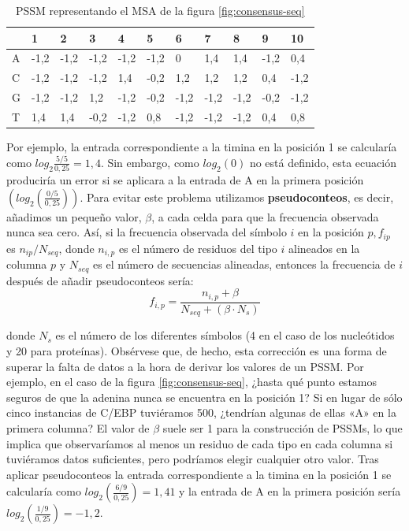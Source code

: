 \begin{table}[htbp]
\centering
\begin{tabular}{l | l l l l l l l l l l }
& 1 & 2 & 3 & 4 & 5 & 6 & 7 & 8 & 9 & 10 \\ \hline
A & -1,2 & -1,2 & -1,2 & -1,2 & -1,2 & 0 & 1,4 & 1,4 & -1,2 & 0,4 \\
C & -1,2 & -1,2 & -1,2 & 1,4 & -0,2 & 1,2 & 1,2 & 1,2 & 0,4 & -1,2  \\
G & -1,2 & -1,2 & 1,2 & -1,2 & -0,2 & -1,2 & -1,2 & -1,2 & -0,2 & -1,2  \\
T & 1,4 & 1,4 & -0,2 & -1,2 & 0,8 & -1,2 & -1,2 & -1,2 & 0,4 & 0,8  \\
\end{tabular}
\caption{PSSM representando el MSA de la figura \ref{fig:consensus-seq}}
\end{table}

Por ejemplo, la entrada correspondiente a la timina en la posición 1 se calcularía como $log_2 \frac{5/5}{0,25} = 1,4$. Sin embargo, como $log_2(0)$ no está definido, esta ecuación produciría un error si se aplicara a la entrada de A en la primera posición $(log_2(\frac{0/5}{0,25}))$. Para evitar este problema utilizamos \textbf{pseudoconteos}, es decir, añadimos un pequeño valor, $\beta$, a cada celda para que la frecuencia observada nunca sea cero. Así, si la frecuencia observada del símbolo $i$ en la posición $p, f_{ip}$ es $n_{ip}/N_{seq}$, donde $n_{i,p}$ es el número de residuos del tipo $i$ alineados en la columna $p$ y $N_{seq}$ es el número de secuencias alineadas, entonces la frecuencia de $i$ después de añadir pseudoconteos sería:
$$f_{i,p} = \frac{n_{i,p} + \beta}{N_{seq} + (\beta \cdot N_s)}$$

donde $N_s$ es el número de los diferentes símbolos (4 en el caso de los nucleótidos y 20 para proteínas). Obsérvese que, de hecho, esta corrección es una forma de superar la falta de datos a la hora de derivar los valores de un PSSM. Por ejemplo, en el caso de la figura \ref{fig:consensus-seq}, ¿hasta qué punto estamos seguros de que la adenina nunca se encuentra en la posición 1? Si en lugar de sólo cinco instancias de C/EBP tuviéramos 500, ¿tendrían algunas de ellas «A» en la primera columna? El valor de $\beta$ suele ser 1 para la construcción de PSSMs, lo que implica que observaríamos al menos un residuo de cada tipo en cada columna si tuviéramos datos suficientes, pero podríamos elegir cualquier otro valor. Tras aplicar pseudoconteos la entrada correspondiente a la timina en la posición 1 se calcularía como $log _2(\frac{6/9}{0,25}) = 1,41$ y la entrada de A en la primera posición sería $log_2(\frac{1/9}{0,25}) =-1,2$.

